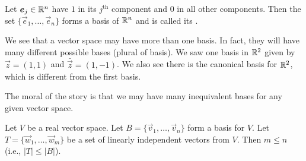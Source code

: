 \begin{example}\label{ex:basis:canonical-basis}
Let $\boldsymbol{e}_{j}\in\mathbb{R}^{n}$ have $1$ in its $j^{\text{th}}$ component
and $0$ in all other components. Then the set
$\{\vec{e}_{1},\dots,\vec{e}_{n}\}$ forms a basis of $\mathbb{R}^{n}$ and is
called its .
\end{example}

We see that a vector space may have more than one basis. In fact, they
will have many different possible bases (plural of basis). We saw one
basis in $\mathbb{R}^{2}$ given by $\vec{z}=(1,1)$ and
$\bar{\vec{z}}=(1,-1)$. We also see there is the canonical basis for
$\mathbb{R}^{2}$, which is different from the first basis.

The moral of the story is that we may have many inequivalent bases for
any given vector space.

\begin{lemma}
Let $V$ be a real vector space.
Let $B=\{\vec{v}_{1},\dots,\vec{v}_{n}\}$ form a basis for $V$.
Let $T=\{\vec{w}_{1},\dots,\vec{w}_{m}\}$ be a set of linearly
independent vectors from $V$.
Then $m\leq n$ (i.e., $|T|\leq|B|$).
\end{lemma}

